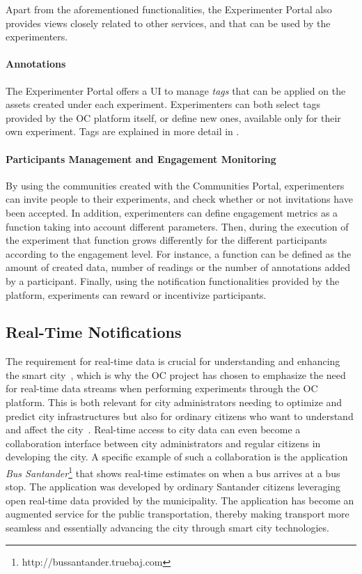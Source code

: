 Apart from the aforementioned functionalities, the Experimenter Portal also provides views closely related to other services, and that can be used by the experimenters.

\paragraph{Annotations}

The Experimenter Portal offers a UI to manage \emph{tags} that can be applied on the assets created under each experiment. Experimenters can both select tags provided by the OC platform itself, or define new ones, available only for their own experiment. Tags are explained in more detail in .

\paragraph{Participants Management and Engagement Monitoring}

By using the communities created with the Communities Portal, experimenters can invite people to their experiments, and check whether or not invitations have been accepted.
In addition, experimenters can define engagement metrics as a function taking into account different parameters. Then, during the execution of the experiment that function grows differently for the different participants according to the engagement level. For instance, a function can be defined as the amount of created data, number of readings or the number of annotations added by a participant. Finally, using the notification functionalities provided by the platform, experiments can reward or incentivize participants.

\subsection{Real-Time Notifications}

The requirement for real-time data is crucial for understanding and enhancing the smart city~\cite{jin2014information}, which is why the OC project has chosen to emphasize the need for real-time data streams when performing experiments through the OC platform. This is both relevant for city administrators needing to optimize and predict city infrastructures but also for ordinary citizens who want to understand and affect the city~\cite{jin2014information}. Real-time access to city data can even become a collaboration interface between city administrators and regular citizens in developing the city. A specific example of such a collaboration is the application \emph{Bus Santander}\footnote{http://bussantander.truebaj.com} that shows real-time estimates on when a bus arrives at a bus stop. The application was developed by ordinary Santander citizens leveraging open real-time data provided by the municipality. The application has become an augmented service for the public transportation, thereby making transport more seamless and essentially advancing the city through smart city technologies.
	
